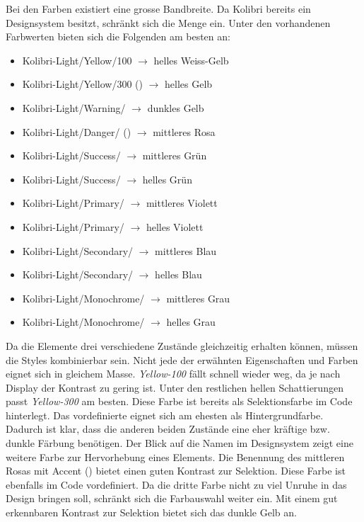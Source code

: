 Bei den Farben existiert eine grosse Bandbreite. 
Da Kolibri bereits ein Designsystem besitzt, schränkt sich die Menge ein. 
Unter den vorhandenen Farbwerten bieten sich die Folgenden am besten an: 

\begin{itemize}
    \item Kolibri-Light/Yellow/100 $\rightarrow$ helles Weiss-Gelb
    \item Kolibri-Light/Yellow/300 () $\rightarrow$ helles Gelb
    \item Kolibri-Light/Warning/ $\rightarrow$ dunkles Gelb
    \item Kolibri-Light/Danger/ () $\rightarrow$ mittleres Rosa
    \item Kolibri-Light/Success/ $\rightarrow$ mittleres Grün
    \item Kolibri-Light/Success/ $\rightarrow$ helles Grün
    \item Kolibri-Light/Primary/ $\rightarrow$ mittleres Violett
    \item Kolibri-Light/Primary/ $\rightarrow$ helles Violett
    \item Kolibri-Light/Secondary/ $\rightarrow$ mittleres Blau
    \item Kolibri-Light/Secondary/ $\rightarrow$ helles Blau
    \item Kolibri-Light/Monochrome/ $\rightarrow$ mittleres Grau
    \item Kolibri-Light/Monochrome/ $\rightarrow$ helles Grau
\end{itemize}

Da die Elemente drei verschiedene Zustände gleichzeitig erhalten können, müssen die Styles kombinierbar sein. 
Nicht jede der erwähnten Eigenschaften und Farben eignet sich in gleichem Masse. 
\emph{Yellow-100} fällt schnell wieder weg, da je nach Display der Kontrast zu gering ist. 
Unter den restlichen hellen Schattierungen passt \emph{Yellow-300} am besten. 
Diese Farbe ist bereits als Selektionsfarbe im Code hinterlegt. 
Das vordefinierte  eignet sich am ehesten als Hintergrundfarbe. 
Dadurch ist klar, dass die anderen beiden Zustände eine eher kräftige bzw. dunkle Färbung benötigen. 
Der Blick auf die Namen im Designsystem zeigt eine weitere Farbe zur Hervorhebung eines Elements. 
Die Benennung des mittleren Rosas mit Accent () bietet einen guten Kontrast zur Selektion. 
Diese Farbe ist ebenfalls im Code vordefiniert. 
Da die dritte Farbe nicht zu viel Unruhe in das Design bringen soll, schränkt sich die Farbauswahl weiter ein. 
Mit einem gut erkennbaren Kontrast zur Selektion bietet sich das dunkle Gelb  an. 

